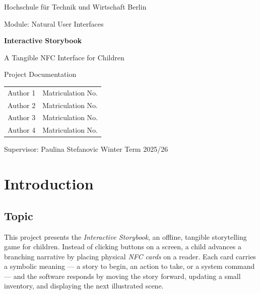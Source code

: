 \begin{titlepage}
\centering
\vspace*{2cm}

{\Large Hochschule f\"ur Technik und Wirtschaft Berlin\par}
{\large Module: Natural User Interfaces\par}
\vspace{2.5cm}

{\Huge\bfseries Interactive Storybook\par}
\vspace{0.5cm}
{\Large A Tangible NFC Interface for Children\par}
\vspace{2.5cm}

{\large Project Documentation\par}
\vspace{2cm}

\begin{tabular}{ll}
Author 1 & Matriculation No.\\
Author 2 & Matriculation No.\\
Author 3 & Matriculation No.\\
Author 4 & Matriculation No.\\
\end{tabular}

\vfill
{Supervisor: Paulina Stefanovic \quad\textbar\quad Winter Term 2025/26\par}
\end{titlepage}

\tableofcontents
\newpage

\section{Introduction}

\subsection{Topic}
This project presents the \emph{Interactive Storybook}, an offline,
tangible storytelling game for children. Instead of clicking buttons on a
screen, a child advances a branching narrative by placing physical
\emph{NFC cards} on a reader. Each card carries a symbolic meaning --- a
story to begin, an action to take, or a system command --- and the software
responds by moving the story forward, updating a small inventory, and
displaying the next illustrated scene.

